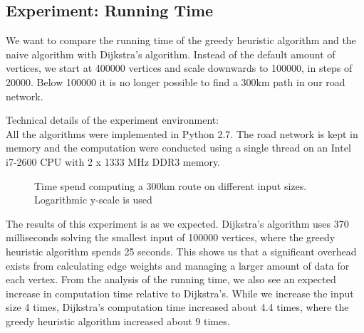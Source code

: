 \subsection{Experiment: Running Time}
We want to compare the running time of the greedy heuristic algorithm and the naive algorithm with Dijkstra's algorithm. Instead of the default amount of vertices, we start at 400000 vertices and scale downwards to 100000, in steps of 20000. Below 100000 it is no longer possible to find a $300 \si{\km}$ path in our road network.

Technical details of the experiment environment:\\
All the algorithms were implemented in Python 2.7. The road network is kept in memory and the computation were conducted using a single thread on an Intel i7-2600 CPU with 2 x 1333 MHz DDR3 memory.

\begin{figure}[!htb]
\centering
{}
\caption{Time spend computing a 300km route on different input sizes. Logarithmic y-scale is used} 
\label{fig:time_comp}
\end{figure}
The results of this experiment is as we expected. Dijkstra's algorithm uses 370 milliseconds solving the smallest input of 100000 vertices, where the greedy heuristic algorithm spends 25 seconds. This shows us that a significant overhead exists from calculating edge weights and managing a larger amount of data for each vertex. From the analysis of the running time, we also see an expected increase in computation time relative to Dijkstra's. While we increase the input size 4 times, Dijkstra's computation time increased about 4.4 times, where the greedy heuristic algorithm increased about 9 times.
